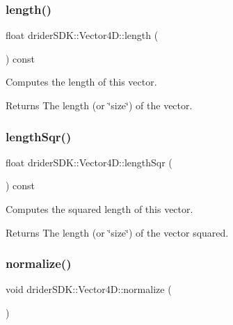 \subsubsection{\texorpdfstring{length()}{length()}}
{\footnotesize\ttfamily float drider\+S\+D\+K\+::\+Vector4\+D\+::length (\begin{DoxyParamCaption}{ }\end{DoxyParamCaption}) const}

Computes the length of this vector.

\begin{DoxyReturn}{Returns}
The length (or \char`\"{}size\char`\"{}) of the vector. 
\end{DoxyReturn}
\mbox{\label{classdrider_s_d_k_1_1_vector4_d_a1ddcf3265baa39efedaa78e650ecabc0}} 
\subsubsection{\texorpdfstring{length\+Sqr()}{lengthSqr()}}
{\footnotesize\ttfamily float drider\+S\+D\+K\+::\+Vector4\+D\+::length\+Sqr (\begin{DoxyParamCaption}{ }\end{DoxyParamCaption}) const}

Computes the squared length of this vector.

\begin{DoxyReturn}{Returns}
The length (or \char`\"{}size\char`\"{}) of the vector squared. 
\end{DoxyReturn}
\mbox{\label{classdrider_s_d_k_1_1_vector4_d_af833f447b91791df7d2a153bf77e127b}} 
\subsubsection{\texorpdfstring{normalize()}{normalize()}}
{\footnotesize\ttfamily void drider\+S\+D\+K\+::\+Vector4\+D\+::normalize (\begin{DoxyParamCaption}{ }\end{DoxyParamCaption})}

